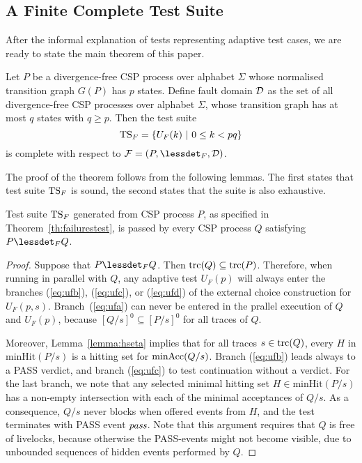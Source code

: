 \subsection{A Finite Complete Test Suite}

After the informal explanation of tests representing adaptive test cases, we are ready to state the main theorem of this paper.

\begin{theorem}\label{th:failurestest}
Let $P$ be a divergence-free CSP process over alphabet $\Sigma$
whose normalised transition graph $G(P)$ has $p$ states. Define fault domain ${\cal D}$ as
the set of all divergence-free CSP processes over alphabet $\Sigma$, whose transition graph
has at most $q$ states with $q \ge p$.
Then the test suite
\[
{\text{TS}}_F = \{ U_F(k)~|~0 \le k < pq  \}
\]
is complete with respect to ${\cal F} = (P,\lessdet_F,{\cal D})$.
\end{theorem}


The proof of the theorem follows from the following lemmas. The first states that test
suite ${\text{TS}}_F$ is sound, the second states that the suite is also exhaustive.

\begin{lemma}\label{lemma:mainfsound}
Test suite ${\text{TS}}_F$ generated from CSP process $P$, as specified in Theorem~\ref{th:failurestest}, is passed by
every CSP process $Q$ satisfying $P\lessdet_F Q$.
\end{lemma}
\begin{proof}
Suppose that $P\lessdet_F Q$. Then 
$\text{trc}(Q)\subseteq \text{trc}(P)$. Therefore, when running in parallel with $Q$, any
adaptive test $U_F(p)$ will always enter the branches (\ref{eq:ufb}),
(\ref{eq:ufc}),  or (\ref{eq:ufd}) of the external choice construction for
$U_F(p,s)$. Branch~(\ref{eq:ufa}) can never be entered in the prallel execution of $Q$ and
$U_F(p)$, because $[Q/s]^0\subseteq [P/s]^0$ for all traces of $Q$.

Moreover,  Lemma~\ref{lemma:hseta}
implies that for all traces $s\in\text{trc}(Q)$, every $H$ in $\text{minHit}(P/s)$ is
a hitting set for $\text{minAcc}(Q/s)$. Branch (\ref{eq:ufb}) leads always to a PASS verdict, and branch
(\ref{eq:ufc}) to test continuation without a verdict. For the last branch,
we note that any selected minimal hitting set $H\in\text{minHit}(P/s)$ has a
non-empty intersection with each of the minimal acceptances of $Q/s$. As a
consequence, $Q/s$ never blocks when offered events from $H$, and the test
terminates with PASS event ${\text{\it pass}}$. Note that this argument requires that
$Q$ is free of livelocks, because otherwise the PASS-events might not become
visible, due to unbounded sequences of hidden events performed by $Q$. 
\xbox
\end{proof}



